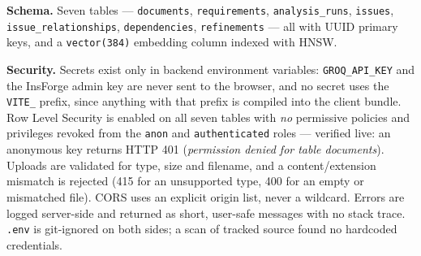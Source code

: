 \textbf{Schema.} Seven tables --- \texttt{documents}, \texttt{requirements},
\texttt{analysis\_runs}, \texttt{issues}, \texttt{issue\_relationships},
\texttt{dependencies}, \texttt{refinements} --- all with UUID primary keys, and
a \texttt{vector(384)} embedding column indexed with HNSW.

\textbf{Security.} Secrets exist only in backend environment variables:
\texttt{GROQ\_API\_KEY} and the InsForge admin key are never sent to the
browser, and no secret uses the \texttt{VITE\_} prefix, since anything with that
prefix is compiled into the client bundle. Row Level Security is enabled on all
seven tables with \emph{no} permissive policies and privileges revoked from the
\texttt{anon} and \texttt{authenticated} roles --- verified live: an anonymous
key returns HTTP 401 (\emph{permission denied for table documents}). Uploads are
validated for type, size and filename, and a content/extension mismatch is
rejected (415 for an unsupported type, 400 for an empty or mismatched file).
CORS uses an explicit origin list, never a wildcard. Errors are logged
server-side and returned as short, user-safe messages with no stack trace.
\texttt{.env} is git-ignored on both sides; a scan of tracked source found no
hardcoded credentials.

